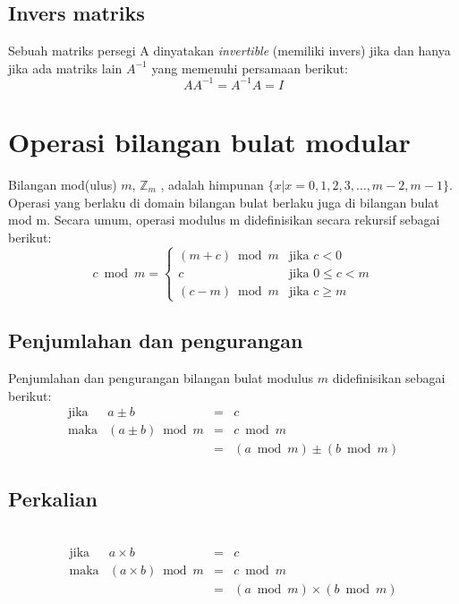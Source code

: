 \begin{enumerate}[label=\alph*.]
\subsection{Invers matriks}
Sebuah matriks persegi A dinyatakan \textit{invertible} (memiliki invers) jika dan
hanya jika ada matriks lain $A^{-1}$ yang memenuhi persamaan berikut:
\begin{equation}
	AA^{-1}=A^{-1}A=I
\end{equation}
\end{enumerate}

\section{Operasi bilangan bulat modular}
Bilangan mod(ulus) $m$, $\mathbb{Z}_m$ , adalah himpunan $\lbrace x|x = 0, 1, 2, 3, \dotsc , m - 2, m -
1 \rbrace $. Operasi yang berlaku di domain bilangan bulat berlaku juga di bilangan bulat
mod m. Secara umum, operasi modulus m didefinisikan secara rekursif sebagai
berikut:
\begin{equation}
c \bmod{m}= \begin{cases}
	(m+c)\bmod{m}	&\text{jika }c<0\\
	c				&\text{jika }0\leq c<m\\
	(c-m)\bmod{m}	&\text{jika }c\geq m
\end{cases}
\end{equation}

\subsection{Penjumlahan dan pengurangan}
Penjumlahan dan pengurangan bilangan bulat modulus $m$ didefinisikan sebagai berikut:
\begin{equation}
\begin{array}{lrcl}
	\text{jika}	& a\pm{b}			&=&c\\
	\text{maka}	& (a\pm b)\bmod m	&=&c\bmod m\\
	\;			&\;					&=&(a\bmod m)\pm (b\bmod m)
\end{array}
\end{equation}

\subsection{Perkalian}\
\begin{equation}
	\begin{array}{lrcl}
		\text{jika}	& a\times b			&=&c\\
		\text{maka}	& (a\times b)\bmod m&=&c\bmod m\\
		\;			&\;					&=&(a\bmod m)\times (b\bmod m)\\
	\end{array}
\end{equation}

